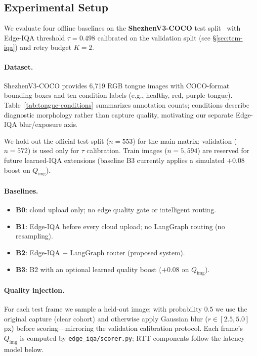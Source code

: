 \subsection{Experimental Setup}
\label{sec:setup}

We evaluate four offline baselines on the \textbf{ShezhenV3-COCO} test split~\cite{zhang2020tongue} with Edge-IQA threshold $\tau{=}0.498$ calibrated on the validation split (see \S\ref{sec:tcm-iqa}) and retry budget $K{=}2$.

\paragraph{Dataset.}
ShezhenV3-COCO provides 6{,}719 RGB tongue images with COCO-format bounding boxes and ten condition labels (e.g., healthy, red, purple tongue).
Table~\ref{tab:tongue-conditions} summarizes annotation counts; conditions describe diagnostic morphology rather than capture quality, motivating our separate Edge-IQA blur/exposure axis.

We hold out the official test split ($n{=}553$) for the main matrix; validation ($n{=}572$) is used only for $\tau$ calibration.
Train images ($n{=}5{,}594$) are reserved for future learned-IQA extensions (baseline B3 currently applies a simulated $+0.08$ boost on $Q_{\mathrm{img}}$).

\paragraph{Baselines.}
\begin{itemize}
  \item \textbf{B0}: cloud upload only; no edge quality gate or intelligent routing.
  \item \textbf{B1}: Edge-IQA before every cloud upload; no LangGraph routing (no resampling).
  \item \textbf{B2}: Edge-IQA + LangGraph router (proposed system).
  \item \textbf{B3}: B2 with an optional learned quality boost ($+0.08$ on $Q_{\mathrm{img}}$).
\end{itemize}

\paragraph{Quality injection.}
For each test frame we sample a held-out image; with probability $0.5$ we use the original capture (clear cohort) and otherwise apply Gaussian blur ($r\in[2.5,5.0]$\,px) before scoring---mirroring the validation calibration protocol.
Each frame's $Q_{\mathrm{img}}$ is computed by \texttt{edge\_iqa/scorer.py}; RTT components follow the latency model below.

